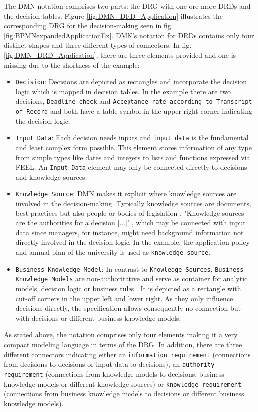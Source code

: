 The DMN notation comprises two parts: the \acl{DRG} with one ore more \aclp{DRD} and the decision tables. Figure \ref{fig:DMN_DRD_Application} illustrates the corresponding \ac{DRG} for the decision-making seen in fig. \ref{fig:BPMNexpandedApplicationEx}. DMN's notation for DRDs contains only four distinct shapes and three different types of connectors. In fig. \ref{fig:DMN_DRD_Application}, there are three elements provided and one is missing due to the shortness of the example: 
\begin{itemize}
\item \texttt{Decision}: Decisions are depicted as rectangles and incorporate the decision logic which is mapped in decision tables. In the example there are two decisions, \texttt{Deadline check} and \texttt{Acceptance rate according to Transcript of Record} and both have a table symbol in the upper right corner indicating the decision logic. 
\item \texttt{Input Data}: Each decision needs inputs and \texttt{input data} is the fundamental and least complex form possible. This element stores information of any type from simple types like dates and integers to lists and functions expressed via \acf{FEEL}. An \texttt{Input Data} element may only be connected directly to decisions and knowledge sources. 
\item \texttt{Knowledge Source}: DMN makes it explicit where knowledge sources are involved in the decision-making. Typically knowledge sources are documents, best practices but also people or bodies of legislation \cite{DMNspec2016}.  "Knowledge sources are the authorities for a decision [...]" \cite{DMNmicroguide}, which may be connected with input data since managers, for instance, might need background information not directly involved in the decision logic. In the example, the application policy and annual plan of the university is used as \texttt{knowledge source}.
\item \texttt{Business Knowledge Model}: In contrast to \texttt{Knowledge Sources}, \texttt{Business Knowledge Models} are non-authoritative and serve as container for analytic models, decision logic or business rules \cite{DMNspec2016}. It is depicted as a rectangle with cut-off corners in the upper left and lower right. As they only influence decisions directly, the specification allows consequently no connection but with decisions or different business knowledge models. 
\end{itemize}

As stated above, the notation comprises only four elements making it a very compact modeling language in terms of the \ac{DRG}. In addition, there are three different connectors indicating either an \texttt{information requirement} (connections from decisions to decisions or input data to decisions), an \texttt{authority requirement} (connections from knowledge models to decisions, business knowledge models or different knowledge sources) or \texttt{knowledge requirement} (connections from business knowledge models to decisions or different business knowledge models). 

